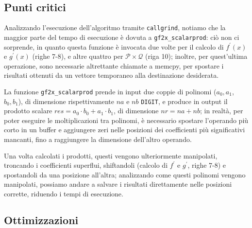 \subsection*{\textbf{Punti critici}}\label{crit}
Analizzando l'esecuzione dell'algoritmo tramite \texttt{callgrind}, notiamo che la 
maggior parte del tempo di esecuzione è dovuta a \texttt{gf2x\_scalarprod}: ciò non ci sorprende, in quanto
questa funzione è invocata due volte per il calcolo di $f^{\prime}(x)$ e $g^{\prime}(x)$ (righe 7-8), e altre quattro per $\mathcal{P \times \mathcal{Q}}$ (riga 10); inoltre,
per quest'ultima operazione, sono necessarie altrettante chiamate a memcpy, per spostare i risultati ottenuti da un vettore temporaneo alla
destinazione desiderata.

La funzione \texttt{gf2x\_scalarprod} prende in input due coppie di polinomi ($a_{0},a_{1}$, $b_{0},b_{1}$), di dimensione rispettivamente $na$ e $nb$ \texttt{DIGIT}, e 
produce in output il prodotto scalare $res = a_{0} \cdot b_{0} + a_{1} \cdot b_{1}$, di dimensione $nr = na+nb$; in realtà, per poter eseguire le moltiplicazioni
tra polinomi, è necessario spostare l'operando più corto in un buffer e aggiungere zeri nelle posizioni dei coefficienti più significativi mancanti, fino
a raggiungere la dimensione dell'altro operando. 

Una volta calcolati i prodotti, questi vengono ulteriormente manipolati, troncando i coefficienti superflui, shiftandoli (calcolo di $f^{\prime}$ e $g^{\prime}$, righe 7-8) e 
spostandoli da una posizione all'altra; analizzando come questi polinomi vengono manipolati, possiamo andare a salvare i risultati direttamente nelle posizioni
corrette, riduendo i tempi di esecuzione.

\subsection*{\textbf{Ottimizzazioni}}\label{ott}

